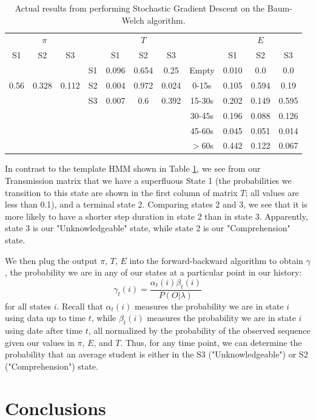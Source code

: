 \documentclass{article} %
\begin{document}
\begin{table}[t]
\begin{center}
\begin{tabular}{ccc|c|ccc|c|ccc}
\multicolumn{3}{c}{$\pi$} && \multicolumn{3}{c}{$T$} && \multicolumn{3}{c}{$E$}\\
S1 & S2 & S3 & & S1 & S2 & S3 && S1 & S2 & S3\\
& & & S1 & 0.096 & 0.654 & 0.25  &Empty & 0.010 & 0.0 & 0.0\\
0.56 & 0.328 & 0.112 & S2 & 0.004 & 0.972 & 0.024 &0-15s& 0.105 & 0.594 & 0.19\\
&&& S3 & 0.007 & 0.6 & 0.392 &15-30s& 0.202 & 0.149 & 0.595\\
&&&&&&&30-45s & 0.196 & 0.088 & 0.126\\
&&&&&&&45-60s & 0.045 & 0.051 & 0.014\\
&&&&&&&$>$60s& 0.442 & 0.122 & 0.067\\
\end{tabular}
\caption{Actual results from performing Stochastic Gradient Descent on the Baum-Welch algorithm.}\label{HMMprop}
\end{center}
\end{table}

In contrast to the template HMM shown in Table \ref{HMMprop}, we see from our Transmission matrix that we have a superfluous State 1 (the probabilities we transition to this state are shown in the first column of matrix $T$; all values are less than 0.1), and a terminal state 2. Comparing states 2 and 3, we see that it is more likely to have a shorter step duration in state 2 than in state 3. Apparently, state 3 is our "Unknowledgeable" state, while state 2 is our "Comprehension" state.

We then plug the output $\pi$, $T$, $E$ into the forward-backward algorithm to obtain $\gamma$, the probability we are in any of our states at a particular point in our history:
$$
\gamma_t(i) = \frac{\alpha_t(i)\beta_t(i)}{P(O|\lambda)}
$$
for all states $i$. Recall that $\alpha_t(i)$ measures the probability we are in state $i$ using data up to time $t$, while $\beta_t(i)$ measures the probability we are in state $i$ using date after time $t$, all normalized by the probability of the observed sequence given our values in $\pi$, $E$, and $T$. Thus, for any time point, we can determine the probability that an average student is either in the S3 ("Unknowledgeable") or S2 ("Comprehension") state.


\section{Conclusions}
\end{document}
